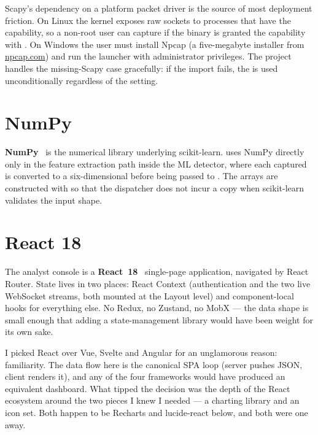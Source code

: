 Scapy's dependency on a platform packet driver is the source of most
deployment friction. On Linux the kernel exposes raw sockets to
processes that have the  capability, so a
non-root user can capture if the binary is granted the capability
with . On Windows the user must install Npcap (a
five-megabyte installer from \href{https://npcap.com}{npcap.com}) and
run the launcher with administrator privileges. The project handles
the missing-Scapy case gracefully: if the import fails, the
 is used unconditionally regardless of the
 setting.

\section{NumPy}
\label{sec:tech-numpy}

\textbf{NumPy}~\cite{numpy} is the numerical library underlying
scikit-learn. \nidsname{} uses NumPy directly only in the feature
extraction path inside the ML detector, where each captured
 is converted to a six-dimensional 
before being passed to . The arrays are
constructed with  so that the dispatcher does not
incur a copy when scikit-learn validates the input shape.

\section{React 18}
\label{sec:tech-react}

The analyst console is a \textbf{React~18}~\cite{react}
single-page application, navigated by React Router. State lives
in two places: React Context (authentication and the two live
WebSocket streams, both mounted at the Layout level) and
component-local  hooks for everything else. No
Redux, no Zustand, no MobX --- the data shape is small enough
that adding a state-management library would have been weight
for its own sake.

I picked React over Vue, Svelte and Angular for an unglamorous
reason: familiarity. The data flow here is the canonical SPA
loop (server pushes JSON, client renders it), and any of the
four frameworks would have produced an equivalent dashboard.
What tipped the decision was the depth of the React ecosystem
around the two pieces I knew I needed --- a charting library and
an icon set. Both happen to be Recharts and lucide-react below,
and both were one  away.


